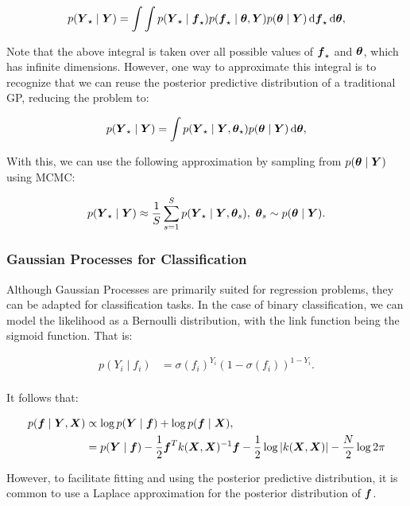\begin{align*}
    p(\boldsymbol{Y}_\star \mid \boldsymbol{Y}) = \int\int p(\boldsymbol{Y}_\star \mid \boldsymbol{f}_\star) p(\boldsymbol{f}_\star \mid \boldsymbol{\theta}, \boldsymbol{Y}) p(\boldsymbol{\theta} \mid \boldsymbol{Y})\, \mathrm{d}\boldsymbol{f}_\star\, \mathrm{d}\boldsymbol{\theta},
\end{align*}

Note that the above integral is taken over all possible values of \( \boldsymbol{f}_\star \) and \( \boldsymbol{\theta} \), which has infinite dimensions.
However, one way to approximate this integral is to recognize that we can reuse the posterior predictive distribution of a traditional GP, reducing the problem to:

\begin{align*}
    p(\boldsymbol{Y}_\star \mid \boldsymbol{Y}) = \int p(\boldsymbol{Y}_\star \mid \boldsymbol{Y}, \boldsymbol{\theta}_\star) p(\boldsymbol{\theta} \mid \boldsymbol{Y})\, \mathrm{d}\boldsymbol{\theta},
\end{align*}

With this, we can use the following approximation by sampling from \( p(\boldsymbol{\theta} \mid \boldsymbol{Y}) \) using MCMC:

\begin{align*}
    p(\boldsymbol{Y}_\star \mid \boldsymbol{Y}) \approx \frac{1}{S} \sum_{s=1}^S p(\boldsymbol{Y}_\star \mid \boldsymbol{Y}, \boldsymbol{\theta}_s),\ \boldsymbol{\theta}_s \sim p(\boldsymbol{\theta} \mid \boldsymbol{Y}).
\end{align*}

\subsubsection{Gaussian Processes for Classification}

Although Gaussian Processes are primarily suited for regression problems, they can be adapted for classification tasks.
In the case of binary classification, we can model the likelihood as a Bernoulli distribution, with the link function being the sigmoid function. That is:

\begin{align}
    p(Y_i \mid f_i) &= \sigma(f_i)^{Y_i} (1 - \sigma(f_i))^{1-Y_i}. \nonumber \\
\end{align}

It follows that:

\begin{align*}
     p(\boldsymbol{f}\mid \boldsymbol{Y}, \boldsymbol{X}) &\propto \log p(\boldsymbol{Y}\mid\boldsymbol{f}) + \log p(\boldsymbol{f}\mid\boldsymbol{X}),\\ &=  p(\boldsymbol{Y}\mid\boldsymbol{f}) - \dfrac{1}{2}\boldsymbol{f}^Tk(\boldsymbol{X},\boldsymbol{X})^{-1}\boldsymbol{f} - \dfrac{1}{2}\log|k(\boldsymbol{X},\boldsymbol{X})| - \dfrac{N}{2}\log 2\pi
\end{align*}

However, to facilitate fitting and using the posterior predictive distribution, it is common to use a Laplace approximation for the posterior distribution of \( \boldsymbol{f} \).

